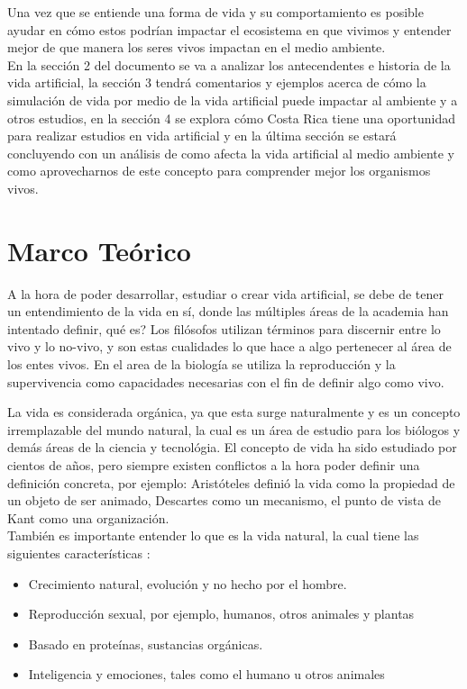\documentclass[conference]{IEEEtran}
\begin{document}
Una vez que se entiende una forma de vida y su comportamiento es posible ayudar en c\'omo estos podr\'ian impactar el ecosistema en que vivimos y entender mejor de que manera los seres vivos impactan en el medio ambiente.\\

En la secci\'on 2 del documento se va a analizar los antecendentes e historia de la vida artificial, la secci\'on 3 tendr\'a comentarios y ejemplos acerca de c\'omo la simulaci\'on de vida por medio de la vida artificial puede impactar al ambiente y a otros estudios, en la secci\'on 4 se explora c\'omo Costa Rica tiene una oportunidad para realizar estudios en vida artificial y en la \'ultima secci\'on se estar\'a concluyendo con un an\'alisis de como afecta la vida artificial al medio ambiente y como aprovecharnos de este concepto para comprender mejor los organismos vivos.

\section{Marco Te\'orico}



A la hora de poder desarrollar, estudiar o crear vida artificial, se debe de tener un entendimiento de la vida en s\'i, donde las m\'ultiples \'areas de la academia han intentado definir, qu\'e es? Los fil\'osofos utilizan t\'erminos para discernir entre lo vivo y lo no-vivo, y son estas cualidades lo que hace a algo pertenecer al \'area de los entes vivos. \cite{lifeStanfordPhi} En el area de la biolog\'ia se utiliza la reproducci\'on y la supervivencia \cite{artificiallifeLevy} como capacidades necesarias con el fin de definir algo como vivo. 

La vida es considerada org\'anica, ya que esta surge naturalmente y es un concepto irremplazable del mundo natural, la cual es un \'area de estudio para los bi\'ologos y dem\'as \'areas de la ciencia y tecnol\'ogia. El concepto de vida ha sido estudiado por cientos de a\~nos, pero siempre existen conflictos a la hora poder definir una definici\'on concreta, por ejemplo: Arist\'oteles defini\'o la vida como la propiedad de un objeto de ser animado, Descartes como un mecanismo, el punto de vista de Kant como una organizaci\'on. \cite{lifeStanfordPhi} \\
Tambi\'en es importante entender lo que es la vida natural, la cual tiene las siguientes caracter\'isticas \cite{XUY01} :
\begin{itemize}
\item Crecimiento natural, evoluci\'on y no hecho por el hombre.
\item Reproducci\'on sexual, por ejemplo, humanos, otros animales y plantas
\item Basado en prote\'inas, sustancias org\'anicas.
\item Inteligencia y emociones, tales como el humano u otros animales
\end{itemize}
\end{document}
